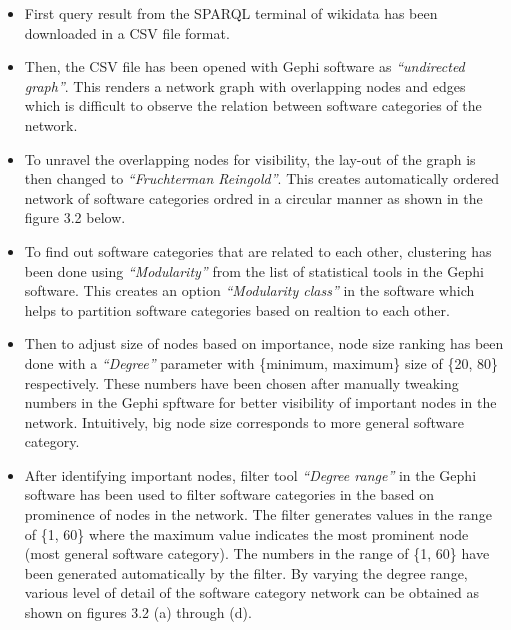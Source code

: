 \begin{itemize}
	\itemsep1em
	\item First query result from the \ac{SPARQL} terminal of wikidata has been downloaded in a \ac{CSV} file format. 
	\item Then, the \ac{CSV} file has been opened with Gephi software as \emph{“undirected graph”}. This renders a network graph with overlapping nodes and edges which is difficult to observe the relation between software categories of the network. 
	\item To unravel the overlapping nodes for visibility, the lay-out of the graph is then changed to \emph{“Fruchterman Reingold”}. This creates automatically ordered network of software categories ordred in a circular manner as shown in the figure 3.2 below. 
	\item To find out software categories that are related to each other, clustering has been done using  \emph{“Modularity”} from the list of statistical tools in the Gephi software. This creates an option \emph{“Modularity class”} in the software which helps to partition software categories based on realtion to each other. 
	\item Then to adjust size of nodes based on importance, node size ranking has been done with a \emph{“Degree”} parameter with \{minimum, maximum\} size of  \{20, 80\} respectively. These numbers have been chosen after manually tweaking numbers in the Gephi spftware for better visibility of important nodes in the network. Intuitively, big node size corresponds to more general software category. 
	
	\item After identifying important nodes, filter tool \emph{“Degree range”} in the Gephi software has been used to filter software categories in the based on prominence of nodes in the network. The filter generates values in the range of \{1, 60\} where the maximum value indicates the most prominent node (most general software category). The numbers in the range of  \{1, 60\} have been generated automatically by the filter. By varying the degree range, various level of detail of the software category network can be obtained as shown on figures 3.2 (a) through (d).
\end{itemize}

